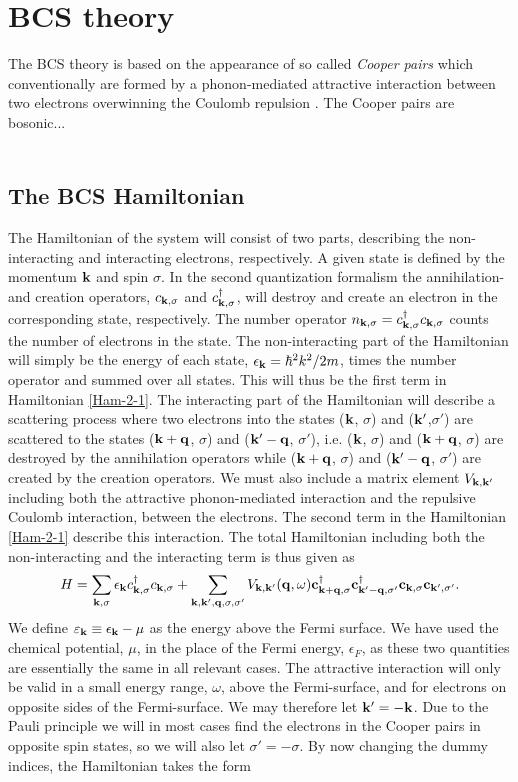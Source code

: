\section{BCS theory} \label{sec:bcs}
The BCS theory is based on the appearance of so called \textit{Cooper pairs} which conventionally are formed by a phonon-mediated attractive interaction between two electrons overwinning the Coulomb repulsion \cite{BCS57}. The Cooper pairs are bosonic...
\\
\\
\subsection{The BCS Hamiltonian}
The Hamiltonian of the system will consist of two parts, describing the non-interacting and interacting electrons, respectively. A given state is defined by the momentum $\bf{k}$ and spin $\sigma$. In the second quantization formalism the annihilation- and creation operators, $c_{\bf{k},\sigma}$ and $c_{\bf{k},\sigma}^{\dagger}$, will destroy and create an electron in the corresponding state, respectively. The number operator $n_{\bf{k},\sigma}=c_{\bf{k},\sigma}^{\dagger}c_{\bf{k},\sigma}$ counts the number of electrons in the state. The non-interacting part of the Hamiltonian will simply be the energy of each state, $\epsilon_{\mathbf{k}} = \hbar^2k^2/2m$, times the number operator and summed over all states. This will thus be the first term in Hamiltonian \eqref{Ham-2-1}. The interacting part of the Hamiltonian will describe a scattering process where two electrons into the states ($\bf{k}$, $\sigma$) and ($\bf{k'}$,$\sigma'$) are scattered to the states ($\bf{k+q}$, $\sigma$) and ($\bf{k'-q}$, $\sigma'$), i.e. ($\bf{k}$, $\sigma$) and  ($\bf{k+q}$, $\sigma$) are destroyed by the annihilation operators while ($\bf{k+q}$, $\sigma$) and ($\bf{k'-q}$, $\sigma'$) are created by the creation operators. We must also include a matrix element $V_{\bf{k,k'}}$ including both the attractive phonon-mediated interaction and the repulsive Coulomb interaction, between the electrons. The second term in the Hamiltonian \eqref{Ham-2-1} describe this interaction. The total Hamiltonian including both the non-interacting and the interacting term is thus given as
\begin{equation}
    H = \sum_{\bf{k},\sigma} \epsilon_{\mathbf{k}} c_{\bf{k},\sigma}^{\dagger} c_{\bf{k},\sigma} + \sum_{\bf{k,k',q},\sigma,\sigma'} V_{\bf{k,k'}}(\bf{q},\omega) c_{\bf{k+q},\sigma}^{\dagger} c_{\bf{k'-q},\sigma'}^{\dagger} c_{\bf{k},\sigma} c_{\bf{k'},\sigma'}.
    \label{Ham-2-1}
\end{equation}
We define $\varepsilon_{\mathbf{k}} \equiv \epsilon_{\mathbf{k}} - \mu$ as the energy above the Fermi surface. We have used the chemical potential, $\mu$, in the place of the Fermi energy, $\epsilon_{F}$, as these two quantities are essentially the same in all relevant cases. The attractive interaction will only be valid in a small energy range, $\omega$, above the Fermi-surface, and for electrons on opposite sides of the Fermi-surface. We may therefore let $\bf{k'}=-\bf{k}$. Due to the Pauli principle we will in most cases find the electrons in the Cooper pairs in opposite spin states, so we will also let $\sigma'=-\sigma$. By now changing the dummy indices, the Hamiltonian takes the form
